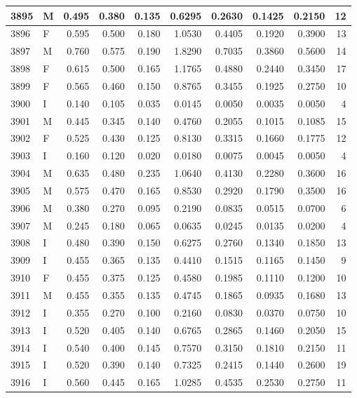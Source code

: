 \documentclass[9pt,twocolumn,twoside,]{pnas-new}
\begin{document}
\begin{tabular}{l|l|r|r|r|r|r|r|r|r}
\hline
3895 & M & 0.495 & 0.380 & 0.135 & 0.6295 & 0.2630 & 0.1425 & 0.2150 & 12\\
\hline
3896 & F & 0.595 & 0.500 & 0.180 & 1.0530 & 0.4405 & 0.1920 & 0.3900 & 13\\
\hline
3897 & M & 0.760 & 0.575 & 0.190 & 1.8290 & 0.7035 & 0.3860 & 0.5600 & 14\\
\hline
3898 & F & 0.615 & 0.500 & 0.165 & 1.1765 & 0.4880 & 0.2440 & 0.3450 & 17\\
\hline
3899 & F & 0.565 & 0.460 & 0.150 & 0.8765 & 0.3455 & 0.1925 & 0.2750 & 10\\
\hline
3900 & I & 0.140 & 0.105 & 0.035 & 0.0145 & 0.0050 & 0.0035 & 0.0050 & 4\\
\hline
3901 & M & 0.445 & 0.345 & 0.140 & 0.4760 & 0.2055 & 0.1015 & 0.1085 & 15\\
\hline
3902 & F & 0.525 & 0.430 & 0.125 & 0.8130 & 0.3315 & 0.1660 & 0.1775 & 12\\
\hline
3903 & I & 0.160 & 0.120 & 0.020 & 0.0180 & 0.0075 & 0.0045 & 0.0050 & 4\\
\hline
3904 & M & 0.635 & 0.480 & 0.235 & 1.0640 & 0.4130 & 0.2280 & 0.3600 & 16\\
\hline
3905 & M & 0.575 & 0.470 & 0.165 & 0.8530 & 0.2920 & 0.1790 & 0.3500 & 16\\
\hline
3906 & M & 0.380 & 0.270 & 0.095 & 0.2190 & 0.0835 & 0.0515 & 0.0700 & 6\\
\hline
3907 & M & 0.245 & 0.180 & 0.065 & 0.0635 & 0.0245 & 0.0135 & 0.0200 & 4\\
\hline
3908 & I & 0.480 & 0.390 & 0.150 & 0.6275 & 0.2760 & 0.1340 & 0.1850 & 13\\
\hline
3909 & I & 0.455 & 0.365 & 0.135 & 0.4410 & 0.1515 & 0.1165 & 0.1450 & 9\\
\hline
3910 & F & 0.455 & 0.375 & 0.125 & 0.4580 & 0.1985 & 0.1110 & 0.1200 & 10\\
\hline
3911 & M & 0.455 & 0.355 & 0.135 & 0.4745 & 0.1865 & 0.0935 & 0.1680 & 13\\
\hline
3912 & I & 0.355 & 0.270 & 0.100 & 0.2160 & 0.0830 & 0.0370 & 0.0750 & 10\\
\hline
3913 & I & 0.520 & 0.405 & 0.140 & 0.6765 & 0.2865 & 0.1460 & 0.2050 & 15\\
\hline
3914 & I & 0.540 & 0.400 & 0.145 & 0.7570 & 0.3150 & 0.1810 & 0.2150 & 11\\
\hline
3915 & I & 0.520 & 0.390 & 0.140 & 0.7325 & 0.2415 & 0.1440 & 0.2600 & 19\\
\hline
3916 & I & 0.560 & 0.445 & 0.165 & 1.0285 & 0.4535 & 0.2530 & 0.2750 & 11\\

\end{tabular}
\end{document}
